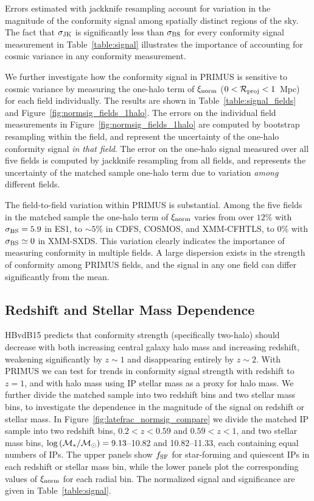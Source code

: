

Errors estimated with jackknife resampling account for variation in the 
magnitude of the conformity signal among spatially distinct regions of the sky.
The fact that $\sigmaJK$ is significantly less than $\sigmaBS$ for every conformity signal measurement in Table~\ref{table:signal}
illustrates the importance of accounting for cosmic variance in any conformity measurement.

We further investigate how the conformity signal in PRIMUS is sensitive to cosmic variance by measuring the one-halo term of $\signorm$ {($0<\mathcal{R}_{\text{proj}}<1$~Mpc)} for each field individually.
The results are shown in Table~\ref{table:signal_fields} and Figure~\ref{fig:normsig_fields_1halo}.
The errors on the individual field measurements in Figure~\ref{fig:normsig_fields_1halo} are computed by bootstrap resampling within the field, and represent the uncertainty of the one-halo conformity signal \emph{in that field}.
The error on the one-halo signal measured over all five fields is computed by jackknife resampling from all fields, and represents the uncertainty of the matched sample one-halo term due to variation \emph{among} different fields.

The field-to-field variation within PRIMUS is substantial.
Among the five fields in the matched sample the one-halo term of 
$\signorm$ varies from over $12\%$ with $\sigmaBS=5.9$ in ES1, to $\sim5$\% in 
CDFS, COSMOS, and XMM-CFHTLS, to $0\%$ with $\sigmaBS\simeq0$ in XMM-SXDS.
This variation clearly indicates the importance of measuring conformity in multiple fields.  A large dispersion exists in the strength of conformity among PRIMUS fields, and the signal in any one field can differ significantly from the mean.


\subsection{Redshift and Stellar Mass Dependence}\label{sec:z_mass_bins}

HBvdB15 predicts that conformity strength (specifically two-halo) should decrease with both increasing central galaxy halo mass and increasing redshift, weakening significantly by $z\sim1$ and disappearing entirely by $z\sim2$.
With PRIMUS we can test for trends in conformity signal strength with redshift to $z=1$, and with halo mass using IP stellar mass as a proxy for halo mass.
We further divide the matched sample into two redshift bins and two stellar mass bins, 
to investigate the dependence in the magnitude of the signal on redshift or 
stellar mass.
In Figure~\ref{fig:latefrac_normsig_compare} we divide the matched IP sample into two redshift bins, ${0.2<z<0.59}$ and ${0.59<z<1}$, and two stellar mass bins, 
${\logM=9.13}$--10.82 and 10.82--11.33, each containing equal numbers of IPs.
The upper panels show $\flate$ for star-forming and quiescent IPs in each redshift or stellar mass bin, while the lower panels plot the corresponding values of
$\signorm$ for each radial bin. The normalized signal and significance are given in 
Table~\ref{table:signal}.

